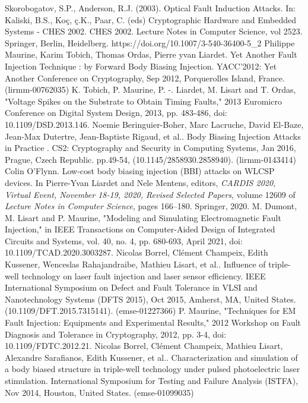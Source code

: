\documentclass[10pt, conference, compsocconf]{IEEEtran}
\begin{document}
\begin{thebibliography}{1}
Skorobogatov, S.P., Anderson, R.J. (2003). Optical Fault Induction Attacks. In: Kaliski, B.S., Koç, ç.K., Paar, C. (eds) Cryptographic Hardware and Embedded Systems - CHES 2002. CHES 2002. Lecture Notes in Computer Science, vol 2523. Springer, Berlin, Heidelberg. https://doi.org/10.1007/3-540-36400-5\_2
Philippe Maurine, Karim Tobich, Thomas Ordas, Pierre yvan Liardet. Yet Another Fault Injection Technique : by Forward Body Biasing Injection. YACC'2012: Yet Another Conference on Cryptography, Sep 2012, Porquerolles Island, France. (lirmm-00762035)
K. Tobich, P. Maurine, P. -. Liardet, M. Lisart and T. Ordas, "Voltage Spikes on the Substrate to Obtain Timing Faults," 2013 Euromicro Conference on Digital System Design, 2013, pp. 483-486, doi: 10.1109/DSD.2013.146.
Noemie Beringuier-Boher, Marc Lacruche, David El-Baze, Jean-Max Dutertre, Jean-Baptiste Rigaud, et al.. Body Biasing Injection Attacks in Practice . CS2: Cryptography and Security in Computing Systems, Jan 2016, Prague, Czech Republic. pp.49-54, (10.1145/2858930.2858940). (lirmm-0143414)
Colin O'Flynn.
\newblock Low-cost body biasing injection {(BBI)} attacks on {WLCSP} devices.
\newblock In Pierre{-}Yvan Liardet and Nele Mentens, editors, {\em{CARDIS}
2020, Virtual Event, November 18-19, 2020, Revised Selected Papers}, volume
12609 of {\em Lecture Notes in Computer Science}, pages 166--180. Springer,
2020.
M. Dumont, M. Lisart and P. Maurine, "Modeling and Simulating Electromagnetic Fault Injection," in IEEE Transactions on Computer-Aided Design of Integrated Circuits and Systems, vol. 40, no. 4, pp. 680-693, April 2021, doi: 10.1109/TCAD.2020.3003287.
Nicolas Borrel, Clément Champeix, Edith Kussener, Wenceslas Rahajandraibe, Mathieu Lisart, et al.. Influence of triple-well technology on laser fault injection and laser sensor efficiency. IEEE International Symposium on Defect and Fault Tolerance in VLSI and Nanotechnology Systems (DFTS 2015), Oct 2015, Amherst, MA, United States. (10.1109/DFT.2015.7315141). (emse-01227366)
P. Maurine, "Techniques for EM Fault Injection: Equipments and Experimental Results," 2012 Workshop on Fault Diagnosis and Tolerance in Cryptography, 2012, pp. 3-4, doi: 10.1109/FDTC.2012.21.
Nicolas Borrel, Clément Champeix, Mathieu Lisart, Alexandre Sarafianos, Edith Kussener, et al.. Characterization and simulation of a body biased structure in triple-well technology under pulsed photoelectric laser stimulation. International Symposium for Testing and Failure Analysis (ISTFA), Nov 2014, Houston, United States. (emse-01099035)

\end{thebibliography}
\end{document}
